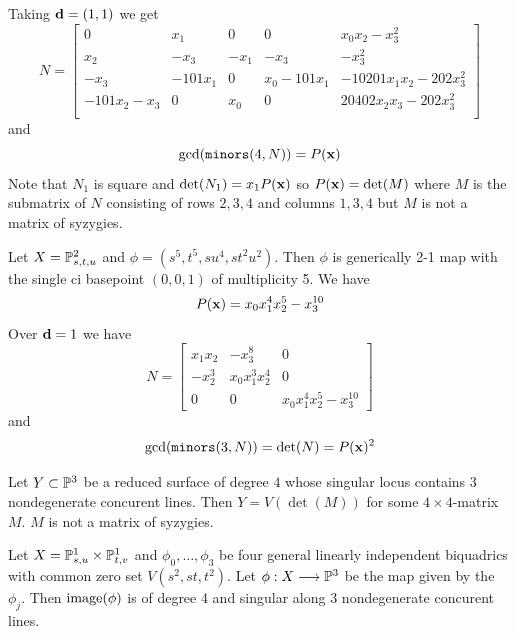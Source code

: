 \documentclass[]{beamer}
\begin{document}
\begin{frame}
\begin{example}[cont]
	Taking $\mathbf d=(1,1)$ we get
	\[
		N=\begin{bmatrix}0&
	       {x}_{1}&
	       0&
	       0&
	       {x}_{0} {x}_{2}-{x}_{3}^{2}\\
	       {x}_{2}&
	       {-{x}_{3}}&
	       {-{x}_{1}}&
	       {-{x}_{3}}&
	       {-{x}_{3}^{2}}\\
	       {-{x}_{3}}&
	       {-101 {x}_{1}}&
	       0&
	       {x}_{0}-101 {x}_{1}&
	       -10201 {x}_{1} {x}_{2}-202 {x}_{3}^{2}\\
	       -101 {x}_{2}-{x}_{3}&
	       0&
	       {x}_{0}&
	       0&
	       20402 {x}_{2} {x}_{3}-202 {x}_{3}^{2}\\
	       \end{bmatrix}
	\]
	and
	\[
		\gcd(\mathop{\tt minors}(4,N))=P(\mathbf x)
	\]
	Note that $N_1$ is square and $\det(N_1)=x_1P(\mathbf x)$ so $P(\mathbf x)=\det(M)$
	where $M$ is the submatrix of $N$ consisting of rows $2,3,4$ and columns $1,3,4$
	but $M$ is not a matrix of syzygies.
\end{example}
\end{frame}

\begin{frame}
\begin{example}
	Let $X=\mathbb{P}^2_{s,t,u}$ and $\phi=(s^5,t^5,su^4,st^2u^2)$.
	Then $\phi$ is generically 2-1 map with the single ci basepoint $(0,0,1)$ of multiplicity 5.
	We have
	\[
		P(\mathbf x)=x_0x_1^4x_2^5-x_3^{10}
	\]
	Over $\mathbf d=1$ we have
	\[
		N=\begin{bmatrix}x_1x_2& -x_3^8& 0\\ -x_2^3& x_0x_1^3x_2^4& 0\\ 0& 0& x_0x_1^4x_2^5-x_3^{10}\end{bmatrix}
	\]
	and
	\[
		\gcd(\mathop{\tt minors}(3,N))=\det(N)=P(\mathbf x)^2
	\]
\end{example}
\end{frame}

\begin{frame}
\begin{lemma}
	Let $Y\subset\mathbb{P}^3$ be a reduced surface of degree $4$ whose singular locus contains 3 nondegenerate concurent lines.
	Then $Y=V(\det(M))$ for some $4\times4$-matrix $M$. $M$ is not a matrix of syzygies.
\end{lemma}
\begin{example}
	Let $X=\mathbb{P}^1_{s,u}\times\mathbb{P}^1_{t,v}$ and $\phi_0,\ldots,\phi_3$ be four general linearly independent
	biquadrics with common zero set $V(s^2,st,t^2)$.
	Let $\phi:X\longrightarrow\mathbb{P}^3$ be the map given by the $\phi_j$.
	Then $\operatorname{image}(\phi)$ is of degree 4 and singular along 3 nondegenerate concurent lines.
\end{example}
\end{frame}
\end{document}
